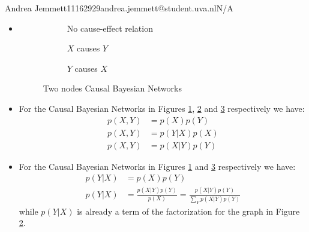 \documentclass{amsmlaj}
\begin{document}
{Andrea Jemmett}{11162929}{andrea.jemmett@student.uva.nl}{N/A}


\begin{problem}
\end{problem}

\begin{problem}
\begin{sol}
	\begin{itemize}
		\item[(a)] \hfill \vspace{-1cm}
			\begin{figure}[h]
				\centering
				\begin{subfigure}[b]{.3\textwidth}
					\centering
					\caption{No cause-effect relation}
					\label{fig:cbn1}
				\end{subfigure}
				\begin{subfigure}[b]{.3\textwidth}
					\centering
					\caption{$X$ causes $Y$}
					\label{fig:cbn2}
				\end{subfigure}
				\begin{subfigure}[b]{.3\textwidth}
					\centering
					\caption{$Y$ causes $X$}
					\label{fig:cbn3}
				\end{subfigure}
				\caption{Two nodes Causal Bayesian Networks}
				\label{fig:cbn}
			\end{figure}
		\item[(b)] For the Causal Bayesian Networks in Figures \ref{fig:cbn1},
			\ref{fig:cbn2} and \ref{fig:cbn3} respectively we have:
			\begin{align}
				p(X,Y) &= p(X)p(Y) \\
				p(X,Y) &= p(Y|X)p(X) \\
				p(X,Y) &= p(X|Y)p(Y)
			\end{align}
		\item[(c)] For the Causal Bayesian Networks in Figures \ref{fig:cbn1}
			and \ref{fig:cbn3} respectively we have:
			\begin{align}
				p(Y|X) &= p(X)p(Y) \\
				p(Y|X) &= \frac{p(X|Y)p(Y)}{p(X)} = \frac{p(X|Y)p(Y)}{\sum_Y p(X|Y)p(Y)}
			\end{align}
			while $p(Y|X)$ is already a term of the factorization for the graph in
			Figure \ref{fig:cbn2}.
	\end{itemize}
\end{sol}
\end{problem}
\end{document}
